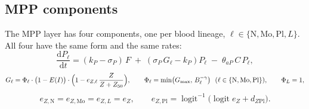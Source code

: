 \documentclass[11pt]{article}
\newcommand{\dd}{\mathrm{d}}
\DeclareMathOperator{\logit}{logit}
\begin{document}
\subsection{MPP components}\label{sec:mpp}
The MPP layer has four components, one per blood lineage, $\ell\in\{\mathrm{N},\mathrm{Mo},\mathrm{Pl},L\}$. All four have the same form and the same rates:
\begin{equation}
\frac{\dd P_\ell}{\dd t} = (k_P-\sigma_P)\,F \;+\; \left(\sigma_P\,G_\ell - k_P\right) P_\ell \;-\; \theta_{aP}\,C\,P_\ell, \label{eq:mpp}
\end{equation}
\begin{equation}
G_\ell = \Phi_\ell\cdot\bigl(1-E(I)\bigr)\cdot\Bigl(1-e_{Z,\ell}\,\frac{Z}{Z+Z_{50}}\Bigr),\qquad
\Phi_\ell=\min\bigl(G_{\max},\,B_\ell^{-\gamma}\bigr)\ \ (\ell\in\{\mathrm{N},\mathrm{Mo},\mathrm{Pl}\}),\qquad \Phi_L=1, \label{eq:G}
\end{equation}
\begin{equation}
e_{Z,\mathrm{N}}=e_{Z,\mathrm{Mo}}=e_{Z,L}=e_Z,\qquad e_{Z,\mathrm{Pl}}=\logit^{-1}\bigl(\logit e_Z+d_{Z\mathrm{Pl}}\bigr). \label{eq:ezpl}
\end{equation}
\end{document}
